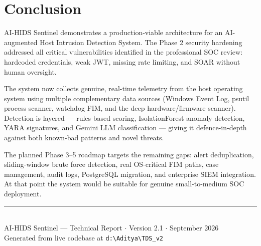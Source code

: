\documentclass[12pt,a4paper]{article}
\begin{document}
\section{Conclusion}

AI-HIDS Sentinel demonstrates a production-viable architecture for an
AI-augmented Host Intrusion Detection System. The Phase 2 security hardening
addressed all critical vulnerabilities identified in the professional SOC review:
hardcoded credentials, weak JWT, missing rate limiting, and SOAR without human oversight.

The system now collects genuine, real-time telemetry from the host operating system
using multiple complementary data sources (Windows Event Log, psutil process scanner,
watchdog FIM, and the deep hardware/firmware scanner). Detection is layered — rules-based
scoring, IsolationForest anomaly detection, YARA signatures, and Gemini LLM classification —
giving it defence-in-depth against both known-bad patterns and novel threats.

The planned Phase 3–5 roadmap targets the remaining gaps: alert deduplication, sliding-window
brute force detection, real OS-critical FIM paths, case management, audit logs, PostgreSQL
migration, and enterprise SIEM integration. At that point the system would be suitable for
genuine small-to-medium SOC deployment.

\vspace{1cm}

\begin{center}
    {\color{primary}\rule{0.8\linewidth}{1pt}}\\[0.4cm]
    {\small\color{darkgray}
    AI-HIDS Sentinel — Technical Report $\cdot$ Version 2.1 $\cdot$ September 2026\\
    Generated from live codebase at \texttt{d:\textbackslash{}Aditya\textbackslash{}TDS\_v2}}
\end{center}
\end{document}
